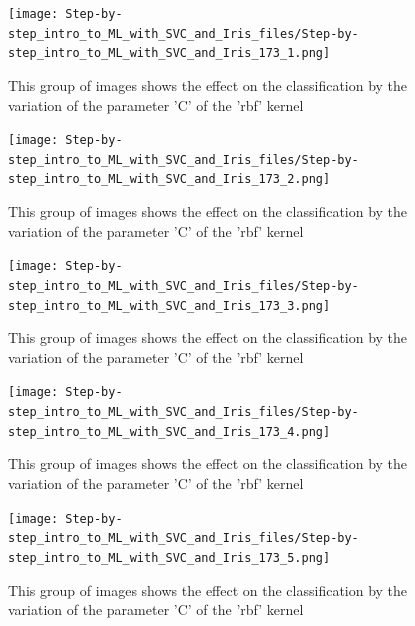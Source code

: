 \documentclass [oneside,10pt,a4paper,ngerman,BCOR10mm,headsepline,parindent,final]{scrartcl}
\begin{document}
    \begin{figure}
        \begin{center}\texttt{[image: Step-by-step\_intro\_to\_ML\_with\_SVC\_and\_Iris\_files/Step-by-step\_intro\_to\_ML\_with\_SVC\_and\_Iris\_173\_1.png]}\end{center}
        \caption{This group of images shows the effect on the classification by the variation of the parameter 'C' of the 'rbf' kernel}
        \label{fig:vary_c_parameter}
    \end{figure}
    
    \begin{figure}
        \begin{center}\texttt{[image: Step-by-step\_intro\_to\_ML\_with\_SVC\_and\_Iris\_files/Step-by-step\_intro\_to\_ML\_with\_SVC\_and\_Iris\_173\_2.png]}\end{center}
        \caption{This group of images shows the effect on the classification by the variation of the parameter 'C' of the 'rbf' kernel}
        \label{fig:vary_c_parameter}
    \end{figure}
    
    \begin{figure}
        \begin{center}\texttt{[image: Step-by-step\_intro\_to\_ML\_with\_SVC\_and\_Iris\_files/Step-by-step\_intro\_to\_ML\_with\_SVC\_and\_Iris\_173\_3.png]}\end{center}
        \caption{This group of images shows the effect on the classification by the variation of the parameter 'C' of the 'rbf' kernel}
        \label{fig:vary_c_parameter}
    \end{figure}
    
    \begin{figure}
        \begin{center}\texttt{[image: Step-by-step\_intro\_to\_ML\_with\_SVC\_and\_Iris\_files/Step-by-step\_intro\_to\_ML\_with\_SVC\_and\_Iris\_173\_4.png]}\end{center}
        \caption{This group of images shows the effect on the classification by the variation of the parameter 'C' of the 'rbf' kernel}
        \label{fig:vary_c_parameter}
    \end{figure}
    
    \begin{figure}
        \begin{center}\texttt{[image: Step-by-step\_intro\_to\_ML\_with\_SVC\_and\_Iris\_files/Step-by-step\_intro\_to\_ML\_with\_SVC\_and\_Iris\_173\_5.png]}\end{center}
        \caption{This group of images shows the effect on the classification by the variation of the parameter 'C' of the 'rbf' kernel}
        \label{fig:vary_c_parameter}
    \end{figure}
    
\end{document}
